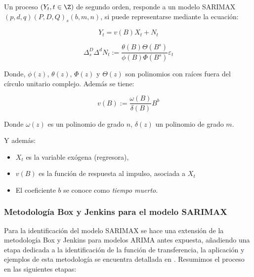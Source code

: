 \documentclass[12pt,oneside]{book}\usepackage[]{graphicx}\usepackage[]{color}
\theoremstyle{definition} %
\begin{document}
\begin{definicion}
Un proceso $(Y_t, t\in\Z)$ de segundo orden,  responde a un modelo SARIMAX$(p,d,q)(P,D,Q)_s(b,m,n)$, si puede representarse mediante la ecuación:

\begin{equation} \label{eq:sarimax_def}
Y_t = v(B) X_t  + N_t
\end{equation}

$$\Delta_s^D  \Delta^d N_t := \frac{\theta(B) \Theta (B^s)}{\phi(B)\Phi (B^s)}\varepsilon_t$$

Donde, $\phi (z)$, $\theta (z)$, $\Phi (z)$ y $\Theta (z)$ son polinomios con raíces fuera del círculo unitario complejo. Además se tiene:

$$v (B):= \frac{\omega (B)}{\delta (B)} B^{b}$$

Donde $\omega(z) $ es un polinomio de grado $n$, $\delta(z) $ un polinomio de grado $m$. 


\end{definicion}

Y además:

\begin{itemize}
\item $X_t $ es la variable exógena (regresora),
\item $v(B)$ es la función de respuesta al impulso, asociada a $X_t$
\item El coeficiente $b$ se conoce como \textit{tiempo muerto}.
\end{itemize}


\subsubsection{Metodología Box y Jenkins para el modelo SARIMAX}
\label{sec:metod_sarimax}
Para la identificación del modelo SARIMAX se hace una extensión de la metodología Box y Jenkins para modelos ARIMA antes expuesta, añadiendo una etapa dedicada a la identificación de la función de transferencia, la aplicación y ejemplos de esta metodología se encuentra detallada en \citeauthor{novales1993econometria} \citeyear{novales1993econometria}. Resumimos el proceso en las siguientes etapas:
\end{document}
